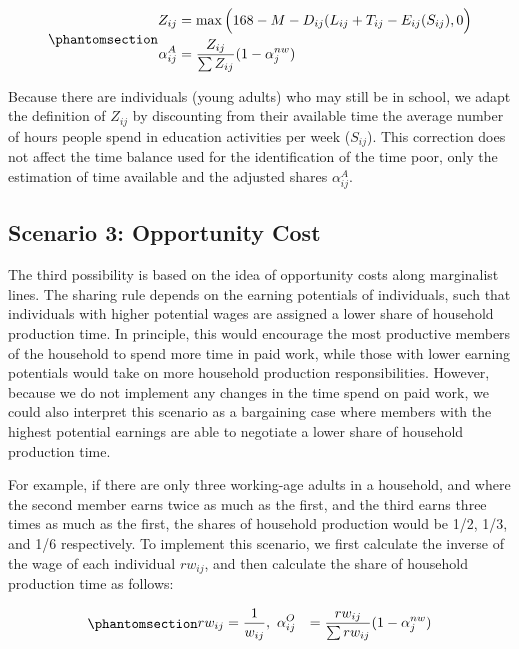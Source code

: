 \documentclass[
  11pt,
]{article}
\begin{document}
\begin{equation}\phantomsection\label{eq-r2}{
\begin{aligned}
Z_{ij} &=\max{\Big(168-M-D_{ij}(L_{ij}+T_{ij}-E_{ij}(S_{ij}),0\Big)} \\
\alpha_{ij}^A &= \frac{Z_{ij}}{\sum Z_{ij}} (1-\alpha_{j}^{nw})
\end{aligned}
}\end{equation}

Because there are individuals (young adults) who may still be in school,
we adapt the definition of \(Z_{ij}\) by discounting from their
available time the average number of hours people spend in education
activities per week (\(S_{ij}\)). This correction does not affect the
time balance used for the identification of the time poor, only the
estimation of time available and the adjusted shares \(\alpha_{ij}^A\).

\subsection{Scenario 3: Opportunity
Cost}\label{scenario-3-opportunity-cost}

The third possibility is based on the idea of opportunity costs along
marginalist lines. The sharing rule depends on the earning potentials of
individuals, such that individuals with higher potential wages are
assigned a lower share of household production time. In principle, this
would encourage the most productive members of the household to spend
more time in paid work, while those with lower earning potentials would
take on more household production responsibilities. However, because we
do not implement any changes in the time spend on paid work, we could
also interpret this scenario as a bargaining case where members with the
highest potential earnings are able to negotiate a lower share of
household production time.

For example, if there are only three working-age adults in a household,
and where the second member earns twice as much as the first, and the
third earns three times as much as the first, the shares of household
production would be 1/2, 1/3, and 1/6 respectively. To implement this
scenario, we first calculate the inverse of the wage of each individual
\(rw_{ij}\), and then calculate the share of household production time
as follows:

\begin{equation}\phantomsection\label{eq-r3}{\begin{aligned}
rw_{ij} &= \frac{1}{w_{ij}}, \ 
\alpha_{ij}^O &= \frac{rw_{ij}}{\sum rw_{ij}} (1-\alpha_{j}^{nw})
\end{aligned}
}\end{equation}
\end{document}
